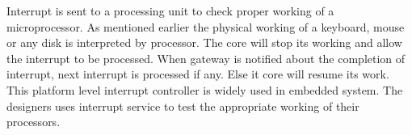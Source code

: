 Interrupt is sent to a processing unit to check proper working of a microprocessor. As mentioned earlier the physical working of a keyboard, mouse or any disk is interpreted by processor. The core will stop its working and allow the interrupt to be processed. When gateway is notified about the completion of interrupt, next interrupt is processed if any. Else it core will resume its work. \\

This platform level interrupt controller is widely used in embedded system. The designers uses interrupt service to test the appropriate working of their processors. 